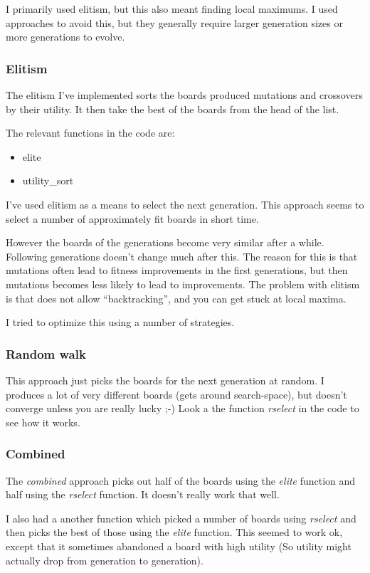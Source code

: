 \documentclass{article}
\begin{document}
I primarily used elitism, but this also meant finding local maximums.
I used approaches to avoid this, but they generally require larger generation
sizes or more generations to evolve.

\subsubsection{Elitism}
The elitism I've implemented sorts the boards produced mutations
and crossovers by their utility. It then take the best of the 
boards from the head of the list.

The relevant functions in the code are:
\begin{itemize}
\item elite
\item utility\_sort
\end{itemize}

I've used elitism as a means to select the next generation.
This approach seems to select a number of approximately fit 
boards in short time. 

However the boards of the generations become very similar after a
while. Following generations doesn't change much after this. The 
reason for this is that mutations often lead to fitness 
improvements in the first generations, but then mutations becomes 
less likely to lead to improvements. 
The problem with elitism is that does not allow ``backtracking'',
and you can get stuck at local maxima. 

I tried to optimize this using a number of strategies. 

\subsubsection{Random walk}
This approach just picks the boards for the next generation 
at random. I produces a lot of very different boards (gets 
around search-space), but doesn't converge unless you are 
really lucky ;-) Look a the function \emph{rselect} in the 
code to see how it works.

\subsubsection{Combined}

The \emph{combined} approach picks out half of the boards using 
the \emph{elite} function and half using the \emph{rselect} 
function. It doesn't really work that well. 

I also had a another function which picked a number of 
boards using \emph{rselect} and then picks the best of 
those using the \emph{elite} function. This seemed to
work ok, except that it sometimes abandoned a board
with high utility (So utility might actually drop from 
generation to generation).
\end{document}
